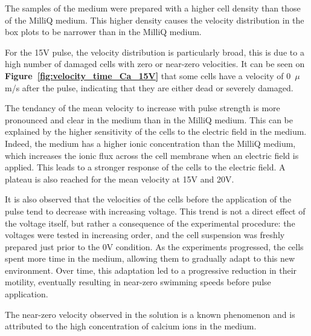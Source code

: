 The samples of the  medium were prepared with a higher cell density than those of the MilliQ medium. This higher density causes the velocity distribution in the box plots to be narrower than in the MilliQ medium. 

For the 15V pulse, the velocity distribution is particularly broad, this is due to a high number of damaged cells with zero or near-zero velocities. It can be seen on \textbf{Figure~\ref{fig:velocity_time_Ca_15V}} that some cells have a velocity of 0~$\mu$m/s after the pulse, indicating that they are either dead or severely damaged. 

The tendancy of the mean velocity to increase with pulse strength is more pronounced and clear in the  medium than in the MilliQ medium. This can be explained by the higher sensitivity of the cells to the electric field in the  medium. Indeed, the  medium has a higher ionic concentration than the MilliQ medium, which increases the ionic flux across the cell membrane when an electric field is applied. This leads to a stronger response of the cells to the electric field. A plateau is also reached for the mean velocity at 15V and 20V.


It is also observed that the velocities of the cells before the application of the pulse tend to decrease with increasing voltage. This trend is not a direct effect of the voltage itself, but rather a consequence of the experimental procedure: the voltages were tested in increasing order, and the cell suspension was freshly prepared just prior to the 0V condition. As the experiments progressed, the cells spent more time in the  medium, allowing them to gradually adapt to this new environment. Over time, this adaptation led to a progressive reduction in their motility, eventually resulting in near-zero swimming speeds before pulse application.

The near-zero velocity observed in the  solution is a known phenomenon \cite{cell_stop} and is attributed to the high concentration of calcium ions in the medium. 



